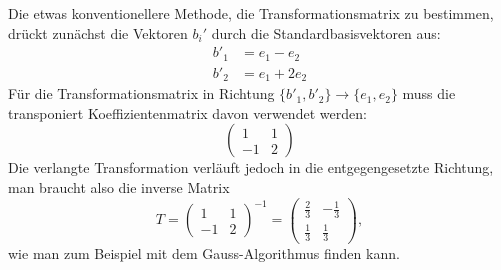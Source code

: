 \begin{diskussion}
Die etwas konventionellere Methode, die Transformationsmatrix zu bestimmen,
drückt zunächst die Vektoren $b_i'$ durch die Standardbasisvektoren aus:
\begin{align*}
b'_1&=e_1-e_2\\
b'_2&=e_1+2e_2
\end{align*}
Für die Transformationsmatrix in Richtung
$\{b'_1,b'_2\}\to\{e_1,e_2\}$ muss die transponiert
Koeffizientenmatrix  davon verwendet werden:
\[
\begin{pmatrix}
1&1\\-1&2
\end{pmatrix}
\]
Die verlangte Transformation verläuft jedoch in die entgegengesetzte
Richtung, man braucht also die inverse Matrix
\[
T=
\begin{pmatrix}
1&1\\-1&2
\end{pmatrix}^{-1}
=
\begin{pmatrix}
\frac23&-\frac13\\
\frac13&\frac13
\end{pmatrix},
\]
wie man zum Beispiel mit dem Gauss-Algorithmus finden kann.
\end{diskussion}

